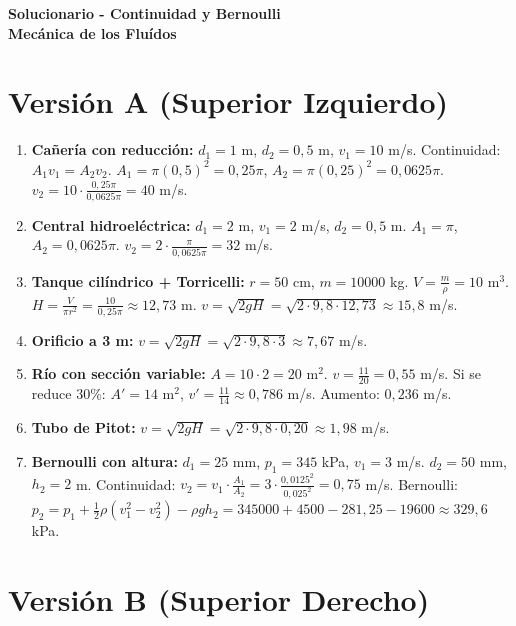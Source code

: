 \documentclass[a4paper,11pt]{article}
\begin{document}
\begin{center}
  \textbf{\Large Solucionario - Continuidad y Bernoulli}\\
  \textbf{\large Mecánica de los Fluídos}
\end{center}

\vspace{0.3cm}

\section*{Versión A (Superior Izquierdo)}

\begin{enumerate}
  \item \textbf{Cañería con reducción:} $d_1=1$ m, $d_2=0,5$ m, $v_1=10$ m/s. Continuidad: $A_1v_1=A_2v_2$. $A_1=\pi(0,5)^2=0,25\pi$, $A_2=\pi(0,25)^2=0,0625\pi$. $v_2=10\cdot\frac{0,25\pi}{0,0625\pi}=40$ m/s.
  \item \textbf{Central hidroeléctrica:} $d_1=2$ m, $v_1=2$ m/s, $d_2=0,5$ m. $A_1=\pi$, $A_2=0,0625\pi$. $v_2=2\cdot\frac{\pi}{0,0625\pi}=32$ m/s.
  \item \textbf{Tanque cilíndrico + Torricelli:} $r=50$ cm, $m=10000$ kg. $V=\frac{m}{\rho}=10$ m$^3$. $H=\frac{V}{\pi r^2}=\frac{10}{0,25\pi}\approx12,73$ m. $v=\sqrt{2gH}=\sqrt{2\cdot9,8\cdot12,73}\approx15,8$ m/s.
  \item \textbf{Orificio a 3 m:} $v=\sqrt{2gH}=\sqrt{2\cdot9,8\cdot3}\approx7,67$ m/s.
  \item \textbf{Río con sección variable:} $A=10\cdot2=20$ m$^2$. $v=\frac{11}{20}=0,55$ m/s. Si se reduce 30\%: $A'=14$ m$^2$, $v'=\frac{11}{14}\approx0,786$ m/s. Aumento: $0,236$ m/s.
  \item \textbf{Tubo de Pitot:} $v=\sqrt{2gH}=\sqrt{2\cdot9,8\cdot0,20}\approx1,98$ m/s.
  \item \textbf{Bernoulli con altura:} $d_1=25$ mm, $p_1=345$ kPa, $v_1=3$ m/s. $d_2=50$ mm, $h_2=2$ m. Continuidad: $v_2=v_1\cdot\frac{A_1}{A_2}=3\cdot\frac{0,0125^2}{0,025^2}=0,75$ m/s. Bernoulli: $p_2=p_1+\frac{1}{2}\rho(v_1^2-v_2^2)-\rho gh_2=345000+4500-281,25-19600\approx329,6$ kPa.
\end{enumerate}

\newpage

\section*{Versión B (Superior Derecho)}
\end{document}
